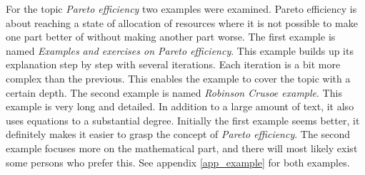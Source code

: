 For the topic \textit{Pareto efficiency} two examples were examined. Pareto efficiency is about reaching a state of allocation of resources where it is not possible to make one part better of without making another part worse. The first example is named \textit{Examples and exercises on Pareto efficiency}. This example builds up its explanation step by step with several iterations. Each iteration is a bit more complex than the previous. This enables the example to cover the topic with a certain depth. The second example is named \textit{Robinson Crusoe example}. This example is very long and detailed. In addition to a large amount of text, it also uses equations to a substantial degree. Initially the first example seems better, it definitely makes it easier to grasp the concept of \textit{Pareto efficiency}. The second example focuses more on the mathematical part, and there will most likely exist some persons who prefer this. See appendix \ref{app_example} for both examples.


\cleardoublepage